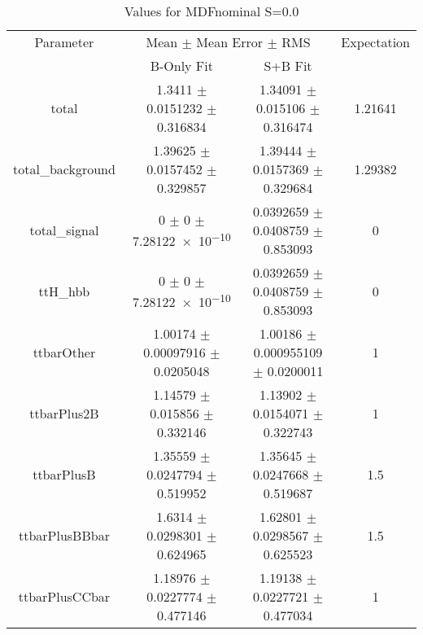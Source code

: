 \begin{table}
\centering
\caption{Values for MDFnominal S=0.0}
\begin{tabular}{cccc}
\toprule
Parameter & \multicolumn{2}{c}{Mean $\pm$ Mean Error $\pm$ RMS} & Expectation\\
 & B-Only Fit & S+B Fit & \\
\midrule
total & \num{1.3411} $\pm$ \num{0.0151232} $\pm$ \num{0.316834} & \num{1.34091} $\pm$ \num{0.015106} $\pm$ \num{0.316474} & \num{1.21641}\\
total\_background & \num{1.39625} $\pm$ \num{0.0157452} $\pm$ \num{0.329857} & \num{1.39444} $\pm$ \num{0.0157369} $\pm$ \num{0.329684} & \num{1.29382}\\
total\_signal & \num{0} $\pm$ \num{0} $\pm$ \num{7.28122e-10} & \num{0.0392659} $\pm$ \num{0.0408759} $\pm$ \num{0.853093} & \num{0}\\
ttH\_hbb & \num{0} $\pm$ \num{0} $\pm$ \num{7.28122e-10} & \num{0.0392659} $\pm$ \num{0.0408759} $\pm$ \num{0.853093} & \num{0}\\
ttbarOther & \num{1.00174} $\pm$ \num{0.00097916} $\pm$ \num{0.0205048} & \num{1.00186} $\pm$ \num{0.000955109} $\pm$ \num{0.0200011} & \num{1}\\
ttbarPlus2B & \num{1.14579} $\pm$ \num{0.015856} $\pm$ \num{0.332146} & \num{1.13902} $\pm$ \num{0.0154071} $\pm$ \num{0.322743} & \num{1}\\
ttbarPlusB & \num{1.35559} $\pm$ \num{0.0247794} $\pm$ \num{0.519952} & \num{1.35645} $\pm$ \num{0.0247668} $\pm$ \num{0.519687} & \num{1.5}\\
ttbarPlusBBbar & \num{1.6314} $\pm$ \num{0.0298301} $\pm$ \num{0.624965} & \num{1.62801} $\pm$ \num{0.0298567} $\pm$ \num{0.625523} & \num{1.5}\\
ttbarPlusCCbar & \num{1.18976} $\pm$ \num{0.0227774} $\pm$ \num{0.477146} & \num{1.19138} $\pm$ \num{0.0227721} $\pm$ \num{0.477034} & \num{1}\\
\bottomrule
\end{tabular}
\end{table}